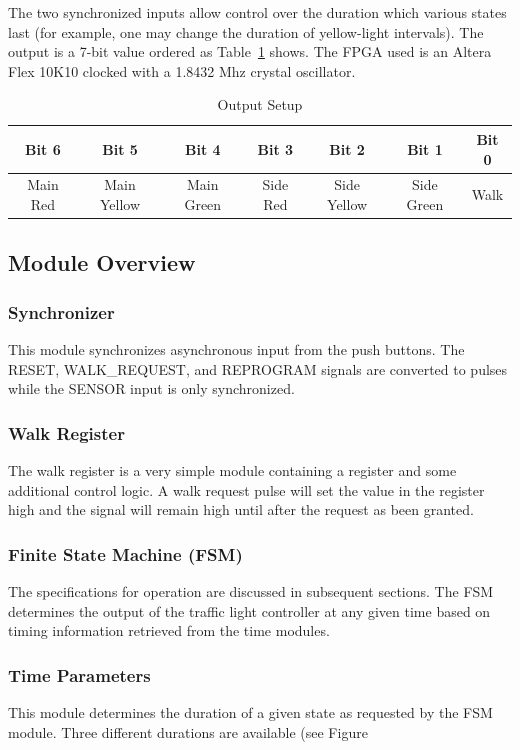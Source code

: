 \documentclass{article}
\begin{document}
	The two synchronized inputs allow control over the duration which
	various states last (for example, one may change the duration of
	yellow-light intervals).  The output is a 7-bit value ordered as
	Table~\ref{tbl:output} shows.  The FPGA used is an Altera Flex 10K10
	clocked with a 1.8432 Mhz crystal oscillator.
	\begin{table}
	\centering
		\begin{tabular}{|c|c|c|c|c|c|c|}
		\hline
		Bit 6 & Bit 5 & Bit 4 & Bit 3 & Bit 2 & Bit 1 & Bit 0 \\ \hline
		Main Red & Main Yellow & Main Green & Side Red & Side Yellow & Side Green & Walk \\ \hline
		\end{tabular}
	\caption{Output Setup}
	\label{tbl:output}
	\end{table}
	

	\subsection{Module Overview}
		\subsubsection{Synchronizer}
		This module synchronizes asynchronous input from the
		push buttons.  The RESET, WALK\_REQUEST, and REPROGRAM
		signals are converted to pulses while the SENSOR input
		is only synchronized.

		\subsubsection{Walk Register}
		The walk register is a very simple module containing a
		register and some additional control logic.  A walk
		request pulse will set the value in the register high
		and the signal will remain high until after the request
		as been granted.

		\subsubsection{Finite State Machine (FSM)}
		The specifications for operation are discussed in
		subsequent sections.  The FSM determines the output of the
		traffic light controller at any given time based on
		timing information retrieved from the time modules.

		\subsubsection{Time Parameters}
		This module determines the duration of a given state
		as requested by the FSM module.  Three different
		durations are available (see Figure 
\end{document}
